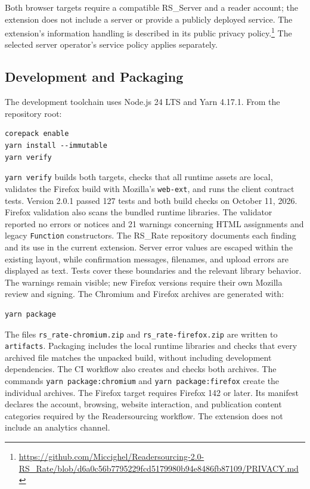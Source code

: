 \documentclass[a4paper, english]{article}
\newcommand{\rsserver}{RS\_Server\xspace}
\newcommand{\rsrate}{RS\_Rate\xspace}
\begin{document}
Both browser targets require a compatible \rsserver and a reader account; the extension does not include a server or provide a publicly deployed service. The extension's information handling is described in its public privacy policy.\footnote{\url{https://github.com/Miccighel/Readersourcing-2.0-RS_Rate/blob/d6a0c56b7795229fcd5179980b94e8486fb87109/PRIVACY.md}} The selected server operator's service policy applies separately.

\subsection{Development and Packaging}

The development toolchain uses Node.js 24 LTS and Yarn 4.17.1. From the repository root:

\begin{lstlisting}
corepack enable
yarn install --immutable
yarn verify
\end{lstlisting}

\verb|yarn verify| builds both targets, checks that all runtime assets are local, validates the Firefox build with Mozilla's \verb|web-ext|, and runs the client contract tests. Version 2.0.1 passed 127 tests and both build checks on October 11, 2026. Firefox validation also scans the bundled runtime libraries. The validator reported no errors or notices and 21 warnings concerning HTML assignments and legacy \verb|Function| constructors. The \rsrate repository documents each finding and its use in the current extension. Server error values are escaped within the existing layout, while confirmation messages, filenames, and upload errors are displayed as text. Tests cover these boundaries and the relevant library behavior. The warnings remain visible; new Firefox versions require their own Mozilla review and signing. The Chromium and Firefox archives are generated with:

\begin{lstlisting}
yarn package
\end{lstlisting}

The files \verb|rs_rate-chromium.zip| and \verb|rs_rate-firefox.zip| are written to \verb|artifacts|. Packaging includes the local runtime libraries and checks that every archived file matches the unpacked build, without including development dependencies. The CI workflow also creates and checks both archives. The commands \verb|yarn package:chromium| and \verb|yarn package:firefox| create the individual archives. The Firefox target requires Firefox 142 or later. Its manifest declares the account, browsing, website interaction, and publication content categories required by the Readersourcing workflow. The extension does not include an analytics channel.
\end{document}
